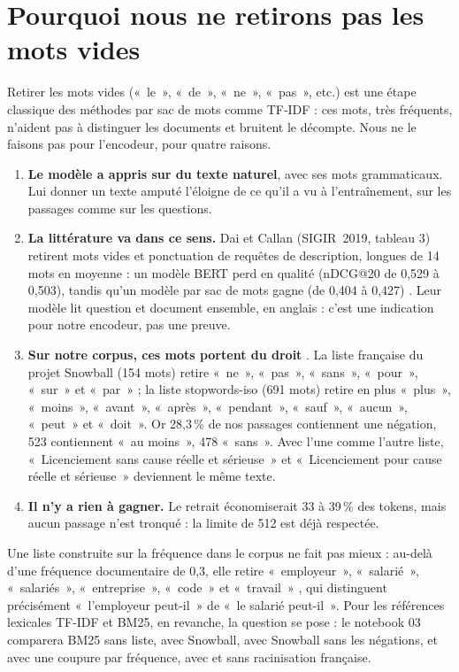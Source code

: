 \section{Pourquoi nous ne retirons pas les mots vides}

Retirer les mots vides («~le~», «~de~», «~ne~», «~pas~», etc.) est une étape classique des méthodes par sac de mots
comme TF-IDF : ces mots, très fréquents, n'aident pas à distinguer les documents et bruitent le décompte. Nous ne
le faisons pas pour l'encodeur, pour quatre raisons.

\begin{enumerate}
\item \textbf{Le modèle a appris sur du texte naturel}, avec ses mots grammaticaux. Lui donner un texte amputé
  l'éloigne de ce qu'il a vu à l'entraînement, sur les passages comme sur les questions.
\item \textbf{La littérature va dans ce sens.} Dai et Callan (SIGIR~2019, tableau 3) retirent mots vides et ponctuation
  de requêtes de description, longues de 14 mots en moyenne : un modèle BERT perd en qualité (nDCG@20 de 0,529 à 0,503), tandis qu'un modèle par sac de mots
  gagne (de 0,404 à 0,427) \source. Leur modèle lit question et document ensemble, en anglais : c'est une indication
  pour notre encodeur, pas une preuve.
\item \textbf{Sur notre corpus, ces mots portent du droit} \mesure. La liste française du projet Snowball (154 mots)
  retire «~ne~», «~pas~», «~sans~», «~pour~», «~sur~» et «~par~» ; la liste stopwords-iso
  (691 mots) retire en plus «~plus~», «~moins~», «~avant~», «~après~», «~pendant~», «~sauf~», «~aucun~», «~peut~»
  et «~doit~». Or 28,3\,\% de nos passages contiennent une négation, 523 contiennent «~au moins~», 478 «~sans~».
  Avec l'une comme l'autre liste, «~Licenciement sans cause réelle et sérieuse~» et «~Licenciement pour cause
  réelle et sérieuse~» deviennent le même texte.
\item \textbf{Il n'y a rien à gagner.} Le retrait économiserait 33 à 39\,\% des tokens, mais aucun passage n'est
  tronqué : la limite de 512 est déjà respectée.
\end{enumerate}

Une liste construite sur la fréquence dans le corpus ne fait pas mieux : au-delà d'une fréquence documentaire de
0,3, elle retire «~employeur~», «~salarié~», «~salariés~», «~entreprise~», «~code~» et «~travail~» \mesure, qui
distinguent précisément «~l'employeur peut-il~» de «~le salarié peut-il~». Pour les références lexicales TF-IDF et
BM25, en revanche, la question se pose : le notebook 03 comparera BM25 sans liste, avec Snowball, avec Snowball
sans les négations, et avec une coupure par fréquence, avec et sans racinisation française.

